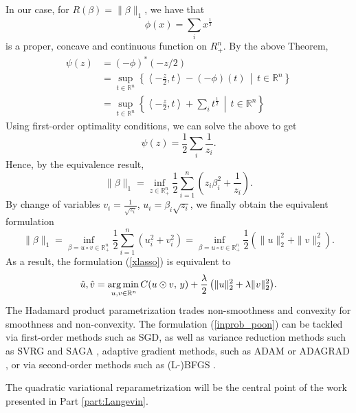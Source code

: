 \documentclass[11pt, twoside]{report}
\begin{document}
In our case, for $R(\beta) = \|\beta\|_1$, we have that 
\[\phi(x) = \sum_i x^{\frac{1}{2}}\]
is a proper, concave and continuous function on $R^n_+$. By the above Theorem,
\begin{align*}
    \psi(z) &= (-\phi)^*(-z/2) \\
            &= \sup_{t \in \mathbb{R}^n} \left\{ \left\langle -\frac{z}{2},t \right\rangle - (-\phi)(t) \, \middle| \, t\in\mathbb{R}^n\right\} \\
            &= \sup_{t \in \mathbb{R}^n} \left\{ \left\langle -\frac{z}{2},t \right\rangle + \sum_i t^{\frac{1}{2}} \, \middle| \, t\in\mathbb{R}^n\right\}
\end{align*}
Using first-order optimality conditions, we can solve the above to get
\[\psi(z) = \frac{1}{2} \sum_i \frac{1}{z_i}.\]
Hence, by the equivalence result,
\begin{equation} \label{quad_form_l1}
    \|\beta\|_1 = \inf_{z \in \mathbb{R}^n_+} \frac{1}{2} \sum_{i=1}^n  \left( z_i \beta_i^2 + \frac{1}{z_i} \right).
\end{equation}
By change of variables $v_i = \frac{1}{\sqrt{z_i}}$, $u_i = \beta_i\sqrt{z_i}$, we finally obtain the equivalent formulation
\begin{equation} \label{uv_form_l1}
    \|\beta\|_1 = \inf_{\beta = u \circ v \in \mathbb{R}^n_+} \frac{1}{2} \sum_{i=1}^n  \left( u_i^2 + v_i^2 \right) = \inf_{\beta = u \circ v \in \mathbb{R}^n_+} \frac{1}{2} \left( \|u\|_2^2 + \|v\|_2^2 \right).
\end{equation}
As a result, the formulation (\ref{xlasso}) is equivalent to 
\begin{equation} \label{inprob_poon}
    \hat{u},\hat{v} = \underset{u,v \in \mathbb{R}^{n}} {\operatorname*{arg\, min \,}}{C(u \odot v, \,y) + \frac \lambda 2 \left( \|u\|^2_2 + \lambda \|v\|^2_2 \right)}. 
\end{equation}
The Hadamard product parametrization trades non-smoothness and convexity for smoothness and non-convexity. The formulation (\ref{inprob_poon}) can be tackled via first-order methods such as SGD, as well as variance reduction methods such as SVRG and SAGA \cite{defazio2014saga, johnson2013accelerating}, adaptive gradient methods, such as ADAM or ADAGRAD \cite{kingma2014adam, gupta2014training}, or via second-order methods such as (L-)BFGS \cite{liu1989limited}.

The quadratic variational reparametrization will be the central point of the work presented in Part \ref{part:Langevin}.

\end{document}
